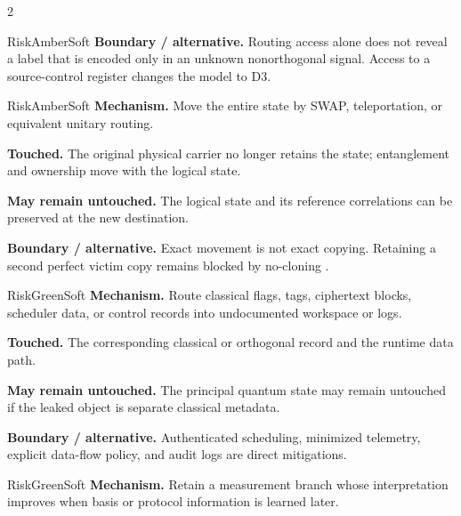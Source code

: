 \begin{multicols}{2}
\begin{matrixrecord}{RiskAmberSoft}
\textbf{Boundary / alternative.} Routing access alone does not reveal a label that is encoded only in an unknown nonorthogonal signal. Access to a source-control register changes the model to D3.

\hfill\matrixback
\end{matrixrecord}

\hypertarget{cell:B4}{}
\begin{matrixrecord}{RiskAmberSoft}
\textbf{Mechanism.} Move the entire state by SWAP, teleportation, or equivalent unitary routing.

\textbf{Touched.} The original physical carrier no longer retains the state; entanglement and ownership move with the logical state.

\textbf{May remain untouched.} The logical state and its reference correlations can be preserved at the new destination.

\textbf{Boundary / alternative.} Exact movement is not exact copying. Retaining a second perfect victim copy remains blocked by no-cloning \cite{bennett1993teleporting,wootters1982cloning}.

\hfill\matrixback
\end{matrixrecord}

\hypertarget{cell:B5}{}
\begin{matrixrecord}{RiskGreenSoft}
\textbf{Mechanism.} Route classical flags, tags, ciphertext blocks, scheduler data, or control records into undocumented workspace or logs.

\textbf{Touched.} The corresponding classical or orthogonal record and the runtime data path.

\textbf{May remain untouched.} The principal quantum state may remain untouched if the leaked object is separate classical metadata.

\textbf{Boundary / alternative.} Authenticated scheduling, minimized telemetry, explicit data-flow policy, and audit logs are direct mitigations.

\hfill\matrixback
\end{matrixrecord}

\hypertarget{cell:B6}{}
\begin{matrixrecord}{RiskGreenSoft}
\textbf{Mechanism.} Retain a measurement branch whose interpretation improves when basis or protocol information is learned later.


\end{matrixrecord}
\end{multicols}

